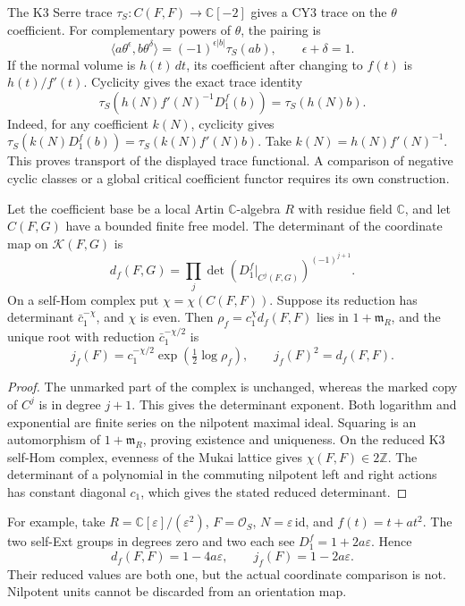 The K3 Serre trace \(\tau_S:C(F,F)\to\mathbb C[-2]\) gives a CY3
trace on the \(\theta\) coefficient.  For complementary powers of
\(\theta\), the pairing is
\[
 \langle a\theta^\epsilon,b\theta^\delta\rangle
 =(-1)^{\epsilon|b|}\tau_S(ab),\qquad \epsilon+\delta=1.
\]
If the normal volume is \(h(t)\,dt\), its coefficient after changing
to \(f(t)\) is \(h(t)/f'(t)\).  Cyclicity gives the exact trace identity
\[
 \tau_S\!\left(h(N)f'(N)^{-1}D_1^f(b)\right)
 =\tau_S(h(N)b).
\]
Indeed, for any coefficient \(k(N)\), cyclicity gives
\(\tau_S(k(N)D_1^f(b))=\tau_S(k(N)f'(N)b)\).
Take \(k(N)=h(N)f'(N)^{-1}\).  This proves transport of the
displayed trace functional.  A comparison of negative cyclic classes
or a global critical coefficient functor requires its own construction.

\begin{proposition}
\label{prop:orientation-coordinate-determinant}
Let the coefficient base be a local Artin \(\mathbb C\)-algebra
\(R\) with residue field \(\mathbb C\),
and let \(C(F,G)\) have a bounded finite free model.  The determinant
of the coordinate map on \(\mathcal K(F,G)\) is
\[
 d_f(F,G)=\prod_j
 \det\!\left(D_1^f|_{C^j(F,G)}\right)^{(-1)^{j+1}}.
\]
On a self-Hom complex put \(\chi=\chi(C(F,F))\).  Suppose its
reduction has determinant \(\bar c_1^{-\chi}\), and \(\chi\) is even.
Then \(\rho_f=c_1^\chi d_f(F,F)\) lies in \(1+\mathfrak m_R\),
and the unique root with reduction \(\bar c_1^{-\chi/2}\) is
\[
 j_f(F)=c_1^{-\chi/2}
 \exp\!\left(\tfrac12\log\rho_f\right),\qquad j_f(F)^2=d_f(F,F).
\]
\end{proposition}
\begin{proof}
The unmarked part of the complex is unchanged, whereas the marked
copy of \(C^j\) is in degree \(j+1\).  This gives the determinant
exponent.  Both logarithm and exponential are finite series on the
nilpotent maximal ideal.  Squaring is an automorphism of
\(1+\mathfrak m_R\), proving existence and uniqueness.  On the
reduced K3 self-Hom complex, evenness of the Mukai lattice gives
\(\chi(F,F)\in2\mathbb Z\).  The determinant of a polynomial in the
commuting nilpotent left and right actions has constant diagonal
\(c_1\), which gives the stated reduced determinant.
\end{proof}

For example, take \(R=\mathbb C[\varepsilon]/(\varepsilon^2)\),
\(F=\mathcal O_S\), \(N=\varepsilon\,\mathrm{id}\), and
\(f(t)=t+at^2\).  The two self-Ext groups in degrees zero and two
each see \(D_1^f=1+2a\varepsilon\).  Hence
\[
 d_f(F,F)=1-4a\varepsilon,
 \qquad j_f(F)=1-2a\varepsilon.
\]
Their reduced values are both one, but the actual coordinate comparison
is not.  Nilpotent units cannot be discarded from an orientation map.

